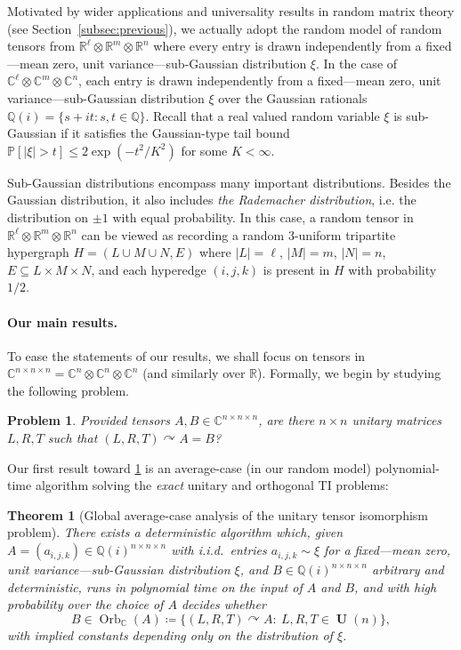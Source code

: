 \documentclass[11pt]{article}
\numberwithin{equation}{section}
\newtheorem{theorem}{Theorem}[section]
\newtheorem{problem}{\bf Problem}
\theoremstyle{remark}
\DeclareMathOperator{\Orb}{Orb}
\DeclareMathOperator{\Unitary}{\textbf{U}}
\newcommand{\Prob}{\mathbb{P}}
\newcommand{\CC}{\mathbb{C}}
\newcommand{\QQ}{\mathbb{Q}}
\newcommand{\RR}{\mathbb{R}}
\begin{document}
Motivated by wider applications and universality results in random matrix theory (see Section~\ref{subsec:previous}), we actually adopt the random model of random tensors from $\RR^\ell\otimes\RR^m\otimes\RR^n$ where every entry is drawn independently from a fixed---mean zero, unit variance---sub-Gaussian distribution $\xi$. In the case of $\CC^\ell\otimes\CC^m\otimes\CC^n$, each entry is drawn independently from a fixed---mean zero, unit variance---sub-Gaussian distribution $\xi$ over the Gaussian rationals $\QQ(i) = \{s + it : s, t \in \QQ\}$. Recall that a real valued random variable $\xi$ is sub-Gaussian if it satisfies the Gaussian-type tail bound $\Prob[|\xi| > t] \leq 2\exp(-t^2/K^2)$ for some $K < \infty$. 

Sub-Gaussian distributions encompass many important distributions. Besides the Gaussian distribution, it also includes \emph{the Rademacher distribution}, i.e. the distribution on $\pm 1$ with equal probability. In this case, a random tensor in $\RR^\ell\otimes\RR^m\otimes\RR^n$ can be viewed as recording a random 3-uniform tripartite hypergraph $H=(L\cup M\cup N, E)$ where $|L|=\ell$, $|M|=m$, $|N|=n$, $E\subseteq L\times M\times N$, and each hyperedge $(i, j, k)$ is present in $H$ with probability $1/2$.

\paragraph{Our main results.}
To ease the statements of our results, we shall focus on tensors in $\CC^{n\times n\times n}=\CC^n\otimes\CC^n\otimes\CC^n$ (and similarly over $\RR$).
Formally, we begin by studying the following problem.

\begin{problem}\label{prob-1}
Provided tensors $A, B \in \CC^{n \times n \times n}$, are there $n \times n$ unitary matrices $L, R, T$ such that $(L, R, T) \curvearrowright A = B$?
\end{problem}

Our first result toward \cref{prob-1} is an average-case (in our random model) polynomial-time algorithm solving the \emph{exact} unitary and orthogonal TI problems:

\begin{theorem}[Global average-case analysis of the unitary tensor isomorphism problem]\label{thm:exactUnitIso}
There exists a deterministic algorithm which, given $A=(a_{i,j,k})\in\QQ(i)^{n\times n\times n}$ with i.i.d.\ entries $a_{i,j,k} \sim \xi$ for a fixed---mean zero, unit variance---sub-Gaussian distribution $\xi$, and $B\in\QQ(i)^{n\times n\times n}$ arbitrary and deterministic, runs in polynomial time on the input of $A$ and $B$, and with high probability over the choice of $A$
decides whether
\[
B\in\Orb_\CC(A)\coloneqq \{(L,R,T)\curvearrowright A:\ L,R,T\in \Unitary(n)\},
\]
with implied constants depending only on the distribution of $\xi$.
\end{theorem}
\end{document}
